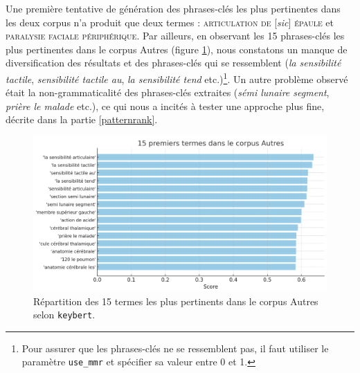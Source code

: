 Une première tentative de génération des phrases-clés les plus pertinentes dans les deux corpus n'a produit que deux termes : \textsc{articulation de} [\textit{sic}] \textsc{épaule} et \textsc{paralysie faciale périphérique}. Par ailleurs, en observant les 15 phrases-clés les plus pertinentes dans le corpus \og Autres \fg{} (figure \ref{fig:keybert_autres}), nous constatons un manque de diversification des résultats et des phrases-clés qui se ressemblent (\textit{la sensibilité tactile}, \textit{sensibilité tactile au}, \textit{la sensibilité tend} etc.)\footnote{Pour assurer que les phrases-clés ne se ressemblent pas, il faut utiliser le paramètre \texttt{use\_mmr} et spécifier sa valeur entre 0 et 1.}. Un autre problème observé était la non-grammaticalité des phrases-clés extraites (\textit{sémi lunaire segment}, \textit{prière le malade} etc.), ce qui nous a incités à tester une approche plus fine, décrite dans la partie \ref{patternrank}.

\begin{figure}[!h]
    \centering
    \includegraphics[width=1\textwidth]{img/keybert_autres.png}
    \caption{Répartition des 15 termes les plus pertinents dans le corpus \og{}Autres\fg{} selon \texttt{keybert}.}
    \label{fig:keybert_autres}
\end{figure}


